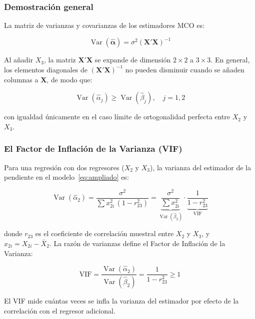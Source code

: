 \documentclass[12pt, letterpaper]{article}
\newcommand{\Var}{\operatorname{Var}}
\begin{document}
\subsubsection{Demostración general}

La matriz de varianzas y covarianzas de los estimadores MCO es:

\begin{equation}
  \Var(\hat{\boldsymbol{\alpha}}) = \sigma^2 (\mathbf{X}'\mathbf{X})^{-1}
\end{equation}

Al añadir $X_3$, la matriz $\mathbf{X}'\mathbf{X}$ se expande de dimensión
$2 \times 2$ a $3 \times 3$. En general, los elementos diagonales de
$(\mathbf{X}'\mathbf{X})^{-1}$ no pueden disminuir cuando se añaden
columnas a $\mathbf{X}$, de modo que:

\begin{equation}
  \Var(\hat{\alpha}_j) \geq \Var(\hat{\beta}_j), \quad j = 1, 2
\end{equation}

con igualdad únicamente en el caso límite de ortogonalidad perfecta entre
$X_2$ y $X_3$.

\subsubsection{El Factor de Inflación de la Varianza (VIF)}

Para una regresión con dos regresores ($X_2$ y $X_3$), la varianza del
estimador de la pendiente en el modelo~\eqref{eq:ampliado} es:

\begin{equation}
  \Var(\hat{\alpha}_2)
  = \frac{\sigma^2}{\sum x_{2i}^2 \,(1 - r_{23}^2)}
  = \underbrace{\frac{\sigma^2}{\sum x_{2i}^2}}_{\Var(\hat{\beta}_2)}
    \cdot
    \underbrace{\frac{1}{1 - r_{23}^2}}_{\mathrm{VIF}}
\end{equation}

donde $r_{23}$ es el coeficiente de correlación muestral entre $X_2$ y
$X_3$, y $x_{2i} = X_{2i} - \bar{X}_2$. La razón de varianzas define el
Factor de Inflación de la Varianza:

\begin{equation}
  \boxed{
    \mathrm{VIF} = \frac{\Var(\hat{\alpha}_2)}{\Var(\hat{\beta}_2)}
    = \frac{1}{1 - r_{23}^2} \geq 1
  }
\end{equation}

El VIF mide cuántas veces se infla la varianza del estimador por efecto de
la correlación con el regresor adicional.
\end{document}
